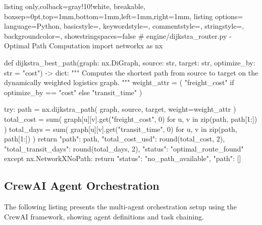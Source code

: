 \begin{tcblisting}{listing only,colback=gray!10!white, breakable, boxsep=0pt,top=1mm,bottom=1mm,left=1mm,right=1mm,
listing options={
language=Python,
basicstyle=\small\ttfamily,
keywordstyle=\color{blue},
commentstyle=\color{gray},
stringstyle=\color{red!70!black},
backgroundcolor=\color{gray!10},
showstringspaces=false}}
# engine/dijkstra_router.py - Optimal Path Computation
import networkx as nx

def dijkstra_best_path(graph: nx.DiGraph,
                        source: str,
                        target: str,
                        optimize_by: str = "cost") -> dict:
    """
    Computes the shortest path from source to target
    on the dynamically weighted logistics graph.
    """
    weight_attr = (
        "freight_cost" if optimize_by == "cost"
        else "transit_time"
    )

    try:
        path = nx.dijkstra_path(
            graph, source, target, weight=weight_attr
        )
        total_cost = sum(
            graph[u][v].get("freight_cost", 0)
            for u, v in zip(path, path[1:])
        )
        total_days = sum(
            graph[u][v].get("transit_time", 0)
            for u, v in zip(path, path[1:])
        )
        return {
            "path": path,
            "total_cost_usd": round(total_cost, 2),
            "total_transit_days": round(total_days, 2),
            "status": "optimal_route_found"
        }
    except nx.NetworkXNoPath:
        return {"status": "no_path_available", "path": []}
\end{tcblisting}

\subsection{CrewAI Agent Orchestration}
The following listing presents the multi-agent orchestration setup using the CrewAI framework, showing agent definitions and task chaining.

